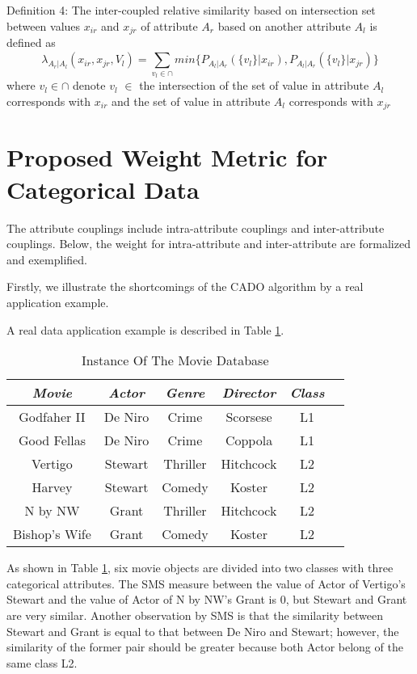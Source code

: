 \documentclass[review]{elsarticle}
\begin{document}
Definition 4: The inter-coupled relative similarity based on intersection set between values $x_{ir}$ and $x_{jr}$ of attribute $A_r$ based on another attribute $A_l$ is defined as
\begin{equation}
\lambda_{A_r|A_l}(x_{ir},x_{jr},V_l) = \sum_{v_l \in \cap}^{}min\{P_{A_l|A_r}(\{v_l\}|x_{ir}),P_{A_l|A_r}(\{v_l\}|x_{jr})\}
\label{equ4}
\end{equation}
where $v_l \in \cap$ denote $v_l$ $\in$ the intersection of the set of value in attribute $A_l$ corresponds with $x_{ir}$ and the set of value in attribute $A_l$ corresponds with $x_{jr}$

\section{Proposed Weight Metric for Categorical Data}
The attribute couplings include intra-attribute couplings and inter-attribute couplings. Below, the weight for intra-attribute and inter-attribute are formalized and exemplified.

Firstly, we illustrate the shortcomings of the CADO algorithm by a real application example.

A real data application example is described in Table \ref{tab:movie data}.
\begin{table}[!h]\tabcolsep=0.065in
\centering
\caption{Instance Of The Movie Database}
\small
\label{tab:movie data}
\begin{tabular}{|c|c|c|c|c|c|}
\hline
\emph{Movie}&\emph{Actor}&\emph{Genre}&\emph{Director}&\emph{Class} \\
\hline
Godfaher II & De Niro & Crime & Scorsese & L1 \\
\hline
Good Fellas & De Niro & Crime & Coppola & L1 \\
\hline
Vertigo & Stewart & Thriller & Hitchcock & L2 \\
\hline
Harvey & Stewart & Comedy & Koster & L2 \\
\hline
N by NW & Grant & Thriller & Hitchcock & L2 \\
\hline
Bishop's Wife & Grant & Comedy & Koster & L2 \\
\hline
\end{tabular}
\end{table}
As shown in Table \ref{tab:movie data}, six movie objects are divided into two classes with three categorical attributes. The SMS measure between the value of Actor of Vertigo's Stewart and the value of Actor of N by NW's Grant is 0, but Stewart and Grant are very similar. Another observation by SMS is that the similarity between Stewart and Grant is equal to that between De Niro and Stewart; however, the similarity of the former pair should be greater because both Actor belong of the same class L2.
\end{document}
